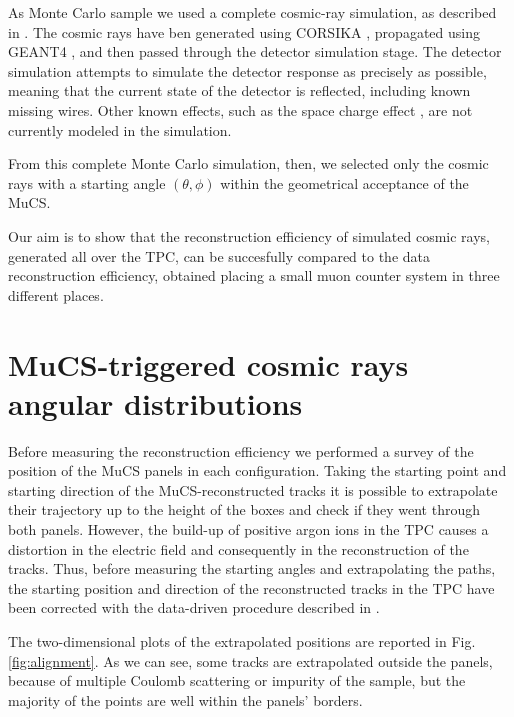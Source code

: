 \documentclass[a4paper]{scrartcl}
\begin{document}
As Monte Carlo sample we used a complete cosmic-ray simulation, as described in \cite{cosmic}. The cosmic rays have ben generated using CORSIKA \cite{corsika},  propagated using GEANT4 \cite{geant}, and then passed through the detector simulation stage. The detector simulation attempts to simulate the detector response as precisely as possible, meaning that the current state of the detector is reflected, including known missing wires. Other known effects, such as the space charge effect \cite{sce}, are not currently modeled in the simulation.

From this complete Monte Carlo simulation, then, we selected only the cosmic rays with a starting angle $(\theta,\phi)$ within the geometrical acceptance of the MuCS.

Our aim is to show that the reconstruction efficiency of simulated cosmic rays, generated all over the TPC, can be succesfully compared to the data reconstruction efficiency, obtained placing a small muon counter system in three different places.

\section{MuCS-triggered cosmic rays angular distributions}\label{sec:flux}
Before measuring the reconstruction efficiency we performed a survey of the position of the MuCS panels in each configuration. Taking the starting point and starting direction of the MuCS-reconstructed tracks it is possible to extrapolate their trajectory up to the height of the boxes and check if they went through both panels. However, the build-up of positive argon ions in the TPC causes a distortion in the electric field and consequently in the reconstruction of the tracks. Thus, before measuring the starting angles and extrapolating the paths, the starting position and direction of the reconstructed tracks in the TPC have been corrected with the data-driven procedure described in \cite{sce}.

The two-dimensional plots of the extrapolated positions are reported in Fig. \ref{fig:alignment}. As we can see, some tracks are extrapolated outside the panels, because of multiple Coulomb scattering or impurity of the sample, but the majority of the points are well within the panels' borders.
\end{document}
